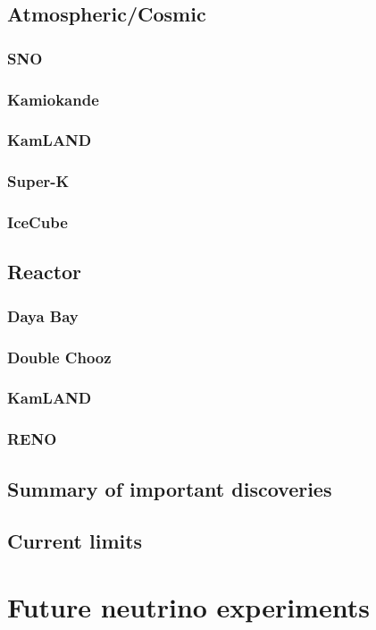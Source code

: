 \subsection{Atmospheric/Cosmic}
\subsubsection{SNO}
\subsubsection{Kamiokande}
\subsubsection{KamLAND}
\subsubsection{Super-K}
\subsubsection{IceCube}

\subsection{Reactor}
\subsubsection{Daya Bay}
\subsubsection{Double Chooz}
\subsubsection{KamLAND}
\subsubsection{RENO}

\subsection{Summary of important discoveries}
\subsection{Current limits}

\section{Future neutrino experiments}

